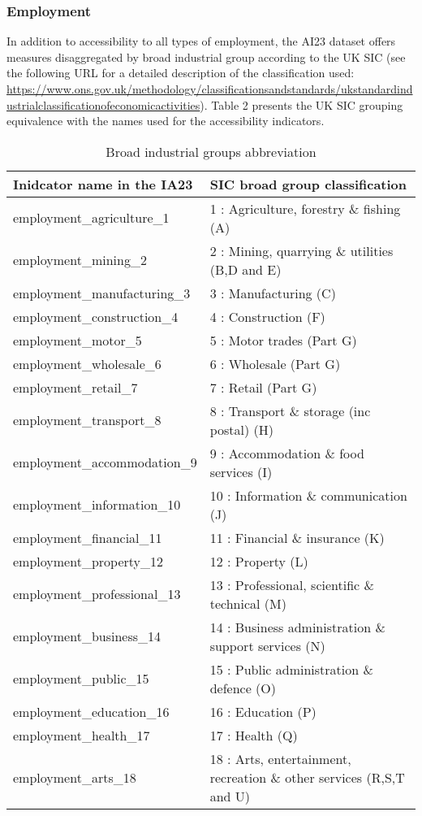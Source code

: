 \documentclass{article}
\begin{document}
\hypertarget{employment}{%
\subsubsection{Employment}\label{employment}}

In addition to accessibility to all types of employment, the AI23
dataset offers measures disaggregated by broad industrial group
according to the UK SIC (see the following URL for a detailed
description of the classification used:
\url{https://www.ons.gov.uk/methodology/classificationsandstandards/ukstandardindustrialclassificationofeconomicactivities}).
Table 2 presents the UK SIC grouping equivalence with the names used for
the accessibility indicators.

\begin{table}[!h]

\caption{\label{tab:unnamed-chunk-3}Broad industrial groups abbreviation}
\centering
\begin{tabu} to 
\toprule
Inidcator name in the IA23 & SIC broad group classification\\
\midrule
employment\_agriculture\_1 & 1 : Agriculture, forestry \& fishing (A)\\
employment\_mining\_2 & 2 : Mining, quarrying \& utilities (B,D and E)\\
employment\_manufacturing\_3 & 3 : Manufacturing (C)\\
employment\_construction\_4 & 4 : Construction (F)\\
employment\_motor\_5 & 5 : Motor trades (Part G)\\
\addlinespace
employment\_wholesale\_6 & 6 : Wholesale (Part G)\\
employment\_retail\_7 & 7 : Retail (Part G)\\
employment\_transport\_8 & 8 : Transport \& storage (inc postal) (H)\\
employment\_accommodation\_9 & 9 : Accommodation \& food services (I)\\
employment\_information\_10 & 10 : Information \& communication (J)\\
\addlinespace
employment\_financial\_11 & 11 : Financial \& insurance (K)\\
employment\_property\_12 & 12 : Property (L)\\
employment\_professional\_13 & 13 : Professional, scientific \& technical (M)\\
employment\_business\_14 & 14 : Business administration \& support services (N)\\
employment\_public\_15 & 15 : Public administration \& defence (O)\\
\addlinespace
employment\_education\_16 & 16 : Education (P)\\
employment\_health\_17 & 17 : Health (Q)\\
employment\_arts\_18 & 18 : Arts, entertainment, recreation \& other services (R,S,T and U)\\
\bottomrule
\end{tabu}
\end{table}
\end{document}
